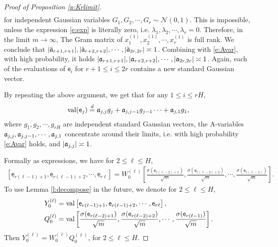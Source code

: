 \documentclass{article}
\numberwithin{equation}{section}
\renewcommand{\cal}{\mathcal}
\newcommand{\cN}{{\cal N}}
\newcommand{\fa}{{\frak a}}
\newcommand{\sfe}{{\mathsf e}}
\newcommand{\la}{\lambda}
\renewcommand{\leq}{\leqslant}
\newcommand{\1}{\mathds{1}}
\theoremstyle{plain} %
\newcommand{\val}{{\rm val}}
\begin{document}
\begin{proof}[Proof of Proposition \ref{p:Krlimit}]
\begin{align}
\end{align}
for independent Gaussian variables $G_1,G_2,\cdots,G_r\sim \cN(0,1)$.
This is impossible, unless the expression \eqref{e:exp} is literally zero, i.e. $\la_1, \la_2,\cdots,\la_r=0$. Therefore, in the limit $m\rightarrow \infty$, The Gram matrix of $x_1^{(1)}, x_2^{(1)}, \cdots, x_r^{(1)}$ is full rank. We conclude that $|\tilde \fa_{r+1,r+1}|,|\tilde \fa_{r+2,r+2}|, \cdots, |\tilde \fa_{2r,2r}|\asymp 1$. Combining with \eqref{e:Avar}, with high probability, it holds $|\fa_{r+1,r+1}|,|\fa_{r+2,r+2}|, \cdots, |\fa_{2r,2r}|\asymp 1$. Again, each of the evaluations of $\sfe_i$ for $r+1\leq i\leq 2r$ contains a new standard Gaussian vector.

By repeating the above argument, we get that for any $1\leq i \leq rH$,
\begin{align*}
\val( \sfe_j)\stackrel{d}{=}\fa_{j,j}g_{j}+\fa_{j,j-1}g_{j-1}\cdots+\fa_{j,1}g_1,
\end{align*}
where $g_1, g_2, \cdots, g_{rH}$ are independent standard Gaussian vectors, the A-variables $\fa_{j,j},\fa_{j,j-1},\cdots,\fa_{j,1}$ concentrate around their limits, i.e. with high probability \eqref{e:Avar} holds, and $|\fa_{j,j}|\asymp 1$.


Formally as expressions, we have for $2\leq \ell\leq H$,
\begin{align*}
\left[\sfe_{r(\ell-1)+1}, \sfe_{r(\ell-1)+2},\cdots,  \sfe_{r\ell}\right]=W_0^{(\ell)}\left[\frac{\sigma( \sfe_{r(\ell-2)+1})}{\sqrt m}, \frac{\sigma( \sfe_{r(\ell-2)+2})}{\sqrt m},\cdots, \frac{\sigma( \sfe_{r(\ell-1)})}{\sqrt m}\right].
\end{align*}
To use Lemma \ref{l:decompose} in the future, we denote for $2\leq \ell \leq H$,
\begin{align*}\begin{split}
&Y_0^{(\ell)}=\val\left[\sfe_{r(\ell-1)+1},  \sfe_{r(\ell-1)+2},\cdots, \sfe_{r\ell}\right],\\
&Q_0^{(\ell)}=\val \left[\frac{\sigma( \sfe_{r(\ell-2)+1})}{\sqrt m}, \frac{\sigma( \sfe_{r(\ell-2)+2})}{\sqrt m},\cdots, \frac{\sigma( \sfe_{r(\ell-1)})}{\sqrt m}\right].
\end{split}\end{align*}
Then $Y_0^{(\ell)}=W_0^{(\ell)}Q_0^{(\ell)}$, for $2\leq \ell \leq H$.


\end{proof}
\end{document}
